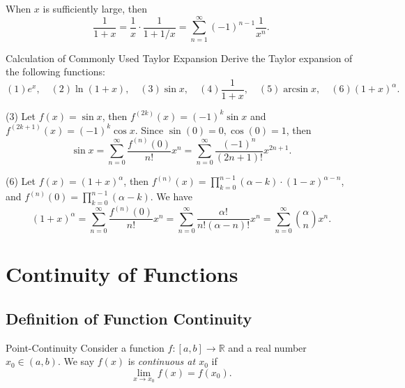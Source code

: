 \begin{note}
  When $x$ is sufficiently large, then
  \begin{equation}
    \frac{1}{1+x} = \frac{1}{x} \cdot \frac{1}{1 + 1/x}
    = \sum\limits_{n = 1}^{\infty} (-1)^{n-1} \frac{1}{x^n}.
  \end{equation}
\end{note}

\begin{example}{Calculation of Commonly Used Taylor Expansion}{}
  Derive the Taylor expansion of the following functions:
  \begin{equation}
    (1) e^x, \quad
    (2) \ln(1+x), \quad
    (3) \sin x, \quad
    (4) \frac{1}{1+x}, \quad
    (5) \arcsin x, \quad
    (6) (1 + x)^{\alpha}.
  \end{equation}
\end{example}

\begin{solution}
  (3) Let $f(x) = \sin x$, then $f^{(2k)}(x) = (-1)^k \sin x$ and $f^{(2k+1)}(x)
  = (-1)^k \cos x$. Since $\sin (0) = 0, \cos (0) = 1$, then
  \begin{equation}
    \sin x = \sum\limits_{n = 0}^{\infty} \frac{f^{(n)}(0)}{n!}x^n
    = \sum\limits_{n = 0}^{\infty} \frac{(-1)^n}{(2n+1)!}x^{2n+1}.
  \end{equation}

  (6) Let $f(x) = (1+x)^{\alpha}$,
  then $f^{(n)}(x) = \prod _{k = 0}^{n-1}(\alpha - k) \cdot (1-x)^{\alpha - n}$,
  and $f^{(n)}(0) = \prod _{k = 0}^{n-1}(\alpha - k)$. We have
  \begin{equation}
    (1+x)^{\alpha} = \sum\limits_{n = 0}^{\infty} \frac{f^{(n)}(0)}{n!}x^n
    = \sum\limits_{n = 0}^{\infty} \frac{\alpha !}{n! (\alpha - n)!}x^n
    = \sum\limits_{n = 0}^{\infty} \binom{\alpha}{n} x^n.
  \end{equation}
\end{solution}


\section{Continuity of Functions}

\subsection{Definition of Function Continuity}

\begin{definition}{Point-Continuity}{}
  Consider a function $f: [a, b] \rightarrow \mathbb{R}$
  and a real number $x_0 \in (a, b)$.
  We say $f(x)$ is \emph{continuous at $x_0$} if
  \begin{equation}
    \lim \limits _{x \rightarrow x_0} f(x) = f(x_0).
  \end{equation}
\end{definition}

